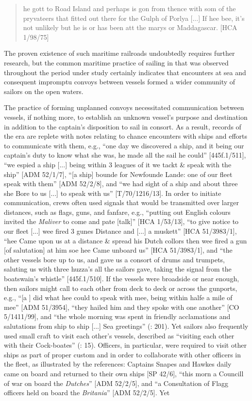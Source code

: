 \begin{quotation}
he gott to Road Island and perhaps is gon from thence with som of the pryvateers that fitted out there for the Gulph of Porlya [...] If hee bee, it’s not unlikely but he is or has been att the marys or Maddagascar. [HCA 1/98/75] 
\end{quotation}

The proven existence of such maritime railroads undoubtedly requires further research, but the common maritime practice of sailing in  that was observed throughout the period under study certainly indicates that encounters at sea and consequent impromptu convoys between vessels formed a wider community of sailors on the open waters. 

The practice of forming unplanned convoys necessitated communication between vessels, if nothing more, to establish an unknown vessel’s purpose and destination in addition to the captain’s disposition to sail in consort. As a result, records of the era are replete with notes relating to chance encounters with ships and efforts to communicate with them, e.g., “one day we discovered a ship, and it being our captain’s duty to know what she was, he made all the sail he could” [445f.1/511], “we espied a ship [...] being within 3 leagues of it we tackt \& speak with the ship” [ADM 52/1/7], “[a ship] bounde for Newfounde Lande: one of our fleet speak with them” [ADM 52/2/8], and “we had sight of a ship and about three she Bore to us [...] to speak with us” [T/70/1216/13]. In order to initiate communication, crews often used signals that would be transmitted over larger distances, such as flags, guns, and fanfare, e.g., “putting out English colours invited the \textit{Maliver} to come and pate [talk]” [HCA 1/53/13], “to give notice to our fleet [...] wee fired 3 gunes Distance and [...] a muskett” [HCA 51/3983/1], “hee Came upon us at a distance \& spread his Dutch collors then wee fired a gun [of salutation] at him soe hee Came unboard us” [HCA 51/3983/1], and “the other vessels bore up to us, and gave us a consort of drums and trumpets, saluting us with three huzza’s all the sailors gave, taking the signal from the boatswain’s whistle”  [445f.1/510]. If the vessels were broadside or near enough, then sailors might call to each other from deck to deck or across the gunports, e.g., “[a ] did what hee could to speak with mee, being within halfe a mile of mee” [ADM 51/3954], “they hailed him and they spoke with one another” [CO 5/1411/99], and “the whole morning was spent in friendly acclamations and salutations from ship to ship [...] Sea greetings” (\citealt{Gage1648}: 201). Yet sailors also frequently used small craft to visit each other’s vessels, described as “visiting each other with their Cock-boates” (\citealt{Gage1648}: 15).  Officers, in particular, were required to visit other ships as part of proper custom and in order to collaborate with other officers in the fleet, as illustrated by the references: Captains Snapes and Hawkes daily came on board and returned to their own ships [SP 42/6], “this morn a Councill of war on board the \textit{Dutches}” [ADM 52/2/5], and “a Consultation of Flagg officers held on board the \textit{Britania}” [ADM 52/2/5]. Yet 